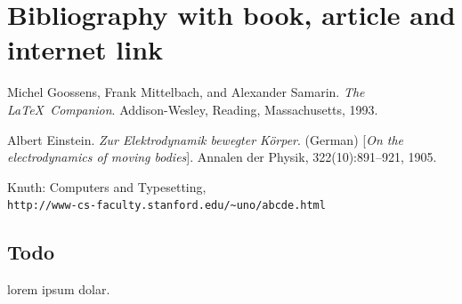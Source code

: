\documentclass{article}
\begin{document}
\section{Bibliography with book, article and internet link}
\begin{thebibliography}{9}
Michel Goossens, Frank Mittelbach, and Alexander Samarin. 
\textit{The \LaTeX\ Companion}. 
Addison-Wesley, Reading, Massachusetts, 1993.

Albert Einstein. 
\textit{Zur Elektrodynamik bewegter K{\"o}rper}. (German) 
[\textit{On the electrodynamics of moving bodies}]. 
Annalen der Physik, 322(10):891–921, 1905.

Knuth: Computers and Typesetting,
\\\texttt{http://www-cs-faculty.stanford.edu/\~{}uno/abcde.html}
\end{thebibliography}



\subsection{Todo}
lorem ipsum dolar.
\end{document}
